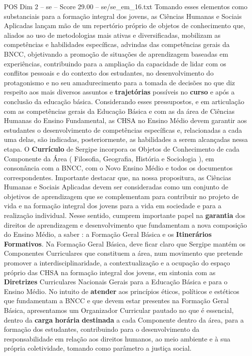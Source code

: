 \begin{textsample}{POS Dim 2 – se – Score 29.00 – se/se\_em\_16.txt}
Tomando esses elementos como substanciais para a formação integral dos jovens, as Ciências Humanas e Sociais Aplicadas lançam mão de um repertório próprio de objetos de conhecimento que, aliados ao uso de metodologias mais ativas e diversificadas, mobilizam as competências e habilidades específicas, advindas das competências gerais da BNCC, objetivando a promoção de situações de aprendizagem baseadas em experiências, contribuindo para a ampliação da capacidade de lidar com os conflitos pessoais e do contexto dos estudantes, no desenvolvimento do protagonismo e no seu amadurecimento para a tomada de decisões no que diz respeito aos mais diversos assuntos e \textbf{trajetórias} possíveis no \textbf{curso} e após a conclusão da educação básica.
Considerando esses pressupostos, e em articulação com as competências gerais da Educação Básica e com as da área de Ciências Humanas do Ensino Fundamental, as CHSA no Ensino Médio devem garantir aos estudantes o desenvolvimento de competências específicas e, relacionadas a cada uma delas, são indicadas, posteriormente, as habilidades a serem alcançadas nessa etapa.
O \textbf{Currículo} de Sergipe incorpora os Objetos de Conhecimento de cada Componente da Área ( Filosofia, Geografia, História e Sociologia ), em consonância com a BNCC, com o Novo Ensino Médio e todos os documentos correspondentes.
Importante destacar que, na nossa propositura, as Ciências Humanas e Sociais Aplicadas devem ser consideradas como um conjunto de objetivos de aprendizagem que se complementam para contribuir no projeto de vida e na formação integral dos jovens para a vida em sociedade e para a realização individual.
Nesse sentido, cumprem importante papel na \textbf{garantia} dos direitos de aprendizagem e desenvolvimento que fundamentam a nova composição do Ensino Médio, a saber : a Formação Geral Básica e os \textbf{Itinerários} \textbf{Formativos}.
Na Formação Geral Básica, deve ficar claro que Sergipe mantém os Componentes Curriculares que constituem a área, num movimento que pretende promover a interdisciplinaridade, a contextualização e a ocupação do espaço próprio das CHSA na formação integral dos jovens, em sintonia com as \textbf{Diretrizes} Curriculares Nacionais Gerais para a Educação Básica e para o Ensino Médio.
No intuito de \textbf{atender} aos princípios éticos, políticos e estéticos que fundamentam a BNCC e que devem estar presentes na Formação Geral Básica, apresentamos um Organizador Curricular pautado no que é essencial, dentro da \textbf{carga} \textbf{horária} \textbf{destinada} a cada Componente dentro da área, para a formação dos estudantes, contribuindo para o desenvolvimento da responsabilidade em relação aos direitos humanos, ao meio ambiente e à sua própria coletividade, tomando como parâmetro a justiça social.

\end{textsample}
